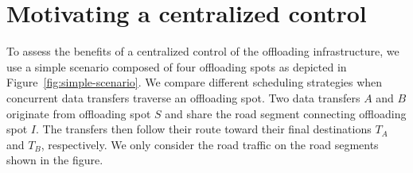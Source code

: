 \section{Motivating a centralized control}
\label{sec:need-for-controller}

To assess the benefits of a centralized control of the offloading infrastructure, we use a simple scenario composed of four offloading spots as depicted in Figure~\ref{fig:simple-scenario}. We compare different scheduling strategies when concurrent data transfers traverse an offloading spot. Two data transfers $A$ and $B$ originate from offloading spot $S$ and share the road segment connecting offloading spot $I$. The transfers then follow their route toward their final destinations $T_A$ and $T_B$, respectively. 
We only consider the road traffic on the road segments shown in the figure.


